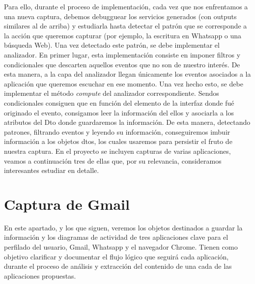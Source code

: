 \documentclass[12pt,a4paper,oneside]{book} %
\begin{document}
\newline \newline 
Para ello, durante el proceso de implementación, cada vez que nos enfrentamos a una nueva captura, debemos debugguear los servicios generados (con outputs similares al de arriba) y estudiarla hasta detectar el patrón que se corresponde a la acción que queremos capturar (por ejemplo, la escritura en Whatsapp o una búsqueda Web). 
\newline \newline 
Una vez detectado este patrón, se debe implementar el analizador. En primer lugar, esta implementación consiste en imponer filtros y condicionales que descarten aquellos eventos que no son de nuestro interés. De esta manera, a la capa del analizador llegan únicamente los eventos asociados a la aplicación que queremos escuchar en ese momento. 
\newline \newline
Una vez hecho esto, se debe implementar el método \textit{compute} del analizador correspondiente. Sendos condicionales consiguen que en función del elemento de la interfaz donde fué originado el evento, consigamos leer la información del ellos y asociarla a los atributos del Dto donde guardaremos la información. 
\newline \newline 
De esta manera, detectando patrones, filtrando eventos y leyendo su información, conseguiremos imbuir información a los objetos dtos, los cuales usaremos para persistir el fruto de nuestra captura. 
\newline \newline 
En el proyecto se incluyen capturas de varias aplicaciones, veamos a continuación tres de ellas que, por su relevancia, consideramos interesantes estudiar en detalle. 
\newpage 
\section{Captura de Gmail}
En este apartado, y los que siguen, veremos los objetos destinados a guardar la información y los diagramas de actividad de tres aplicaciones clave para el perfilado del usuario, Gmail, Whatsapp y el navegador Chrome. Tienen como objetivo clarificar y documentar el flujo lógico que seguirá cada aplicación, durante el proceso de análisis y extracción del contenido de una cada de las aplicaciones propuestas.
\end{document}
